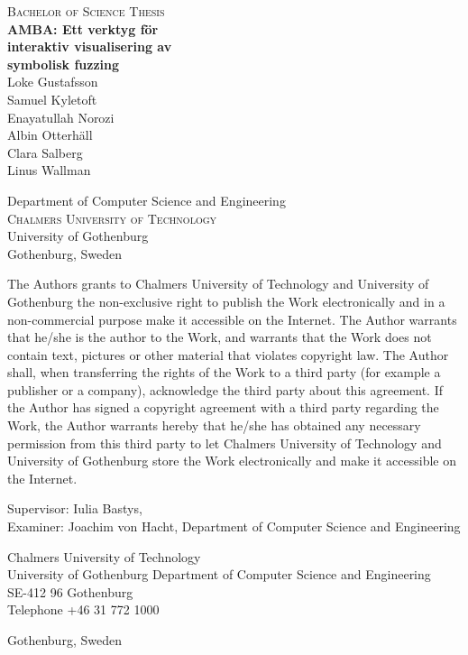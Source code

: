\newpage
\thispagestyle{empty}
\begin{center}
	
	\textsc{\large Bachelor of Science Thesis }\\[4cm]

	\textbf{\Large AMBA: Ett verktyg för \\ interaktiv visualisering av \\ symbolisk fuzzing} \\[1cm]
	{\large Loke Gustafsson} \\
	{\large Samuel Kyletoft} \\
	{\large Enayatullah Norozi} \\
	{\large Albin Otterhäll} \\
	{\large Clara Salberg} \\
	{\large Linus Wallman} \\
	
	\vfill 	

	Department of Computer Science and Engineering\\
	\textsc{Chalmers University of Technology} \\
	{\small University of Gothenburg} \\
	Gothenburg, Sweden \the\year \\
\end{center}


\newpage
{The Authors grants to Chalmers University of Technology and University of Gothenburg the
non-exclusive right to publish the Work electronically and in a non-commercial purpose make it
accessible on the Internet. The Author warrants that he/she is the author to the Work, and
warrants that the Work does not contain text, pictures or other material that violates
copyright law.
The Author shall, when transferring the rights of the Work to a third party (for example a
publisher or a company), acknowledge the third party about this agreement. If the Author has
signed a copyright agreement with a third party regarding the Work, the Author warrants
hereby that he/she has obtained any necessary permission from this third party to let Chalmers
University of Technology and University of Gothenburg store the Work electronically and make
it accessible on the Internet.}

Supervisor: Iulia Bastys, \\
Examiner: Joachim von Hacht, Department of Computer Science and Engineering\setlength{\parskip}{1cm}

Chalmers University of Technology\\
University of Gothenburg
Department of Computer Science and Engineering \\
SE-412 96 Gothenburg\\
Telephone +46 31 772 1000 \setlength{\parskip}{0.5cm}

\vfill
Gothenburg, Sweden \the\year
